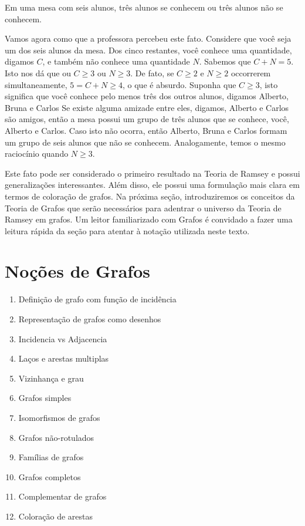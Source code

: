 \begin{fact}
Em uma mesa com seis alunos, três alunos se conhecem ou três alunos não se conhecem.
\end{fact}

Vamos agora como que a professora percebeu este fato. Considere que você seja um dos seis alunos da mesa. Dos cinco restantes, você conhece uma quantidade, digamos $C$, e também não conhece uma quantidade $N$. Sabemos que $C + N = 5$. Isto nos dá que ou $C \geq 3$ ou $N \geq 3$. De fato, se $C \geq 2$ e $N \geq 2$ occorrerem simultaneamente, $5 = C + N \geq 4$, o que é absurdo. Suponha que $C \geq 3$, isto significa que você conhece pelo menos três dos outros alunos, digamos Alberto, Bruna e Carlos Se existe alguma amizade entre eles, digamos, Alberto e Carlos são amigos, então a mesa possui um grupo de três alunos que se conhece, você, Alberto e Carlos. Caso isto não ocorra, então Alberto, Bruna e Carlos formam um grupo de seis alunos que não se conhecem. Analogamente, temos o mesmo raciocínio quando $N \geq 3$.

Este fato pode ser considerado o primeiro resultado na Teoria de Ramsey e possui generalizações interessantes. Além disso, ele possui uma formulação mais clara em termos de coloração de grafos. Na próxima seção, introduziremos os conceitos da Teoria de Grafos que serão necessários para adentrar o universo da Teoria de Ramsey em grafos. Um leitor familiarizado com Grafos é convidado a fazer uma leitura rápida da seção para atentar à notação utilizada neste texto.




\section{Noções de Grafos}


\begin{enumerate}
\item Definição de grafo com função de incidência
\item Representação de grafos como desenhos
\item Incidencia vs Adjacencia
\item Laços e arestas multiplas
\item Vizinhança e grau
\item Grafos simples
\item Isomorfismos de grafos
\item Grafos não-rotulados
\item Famílias de grafos
\item Grafos completos
\item Complementar de grafos
\item Coloração de arestas
\end{enumerate}

